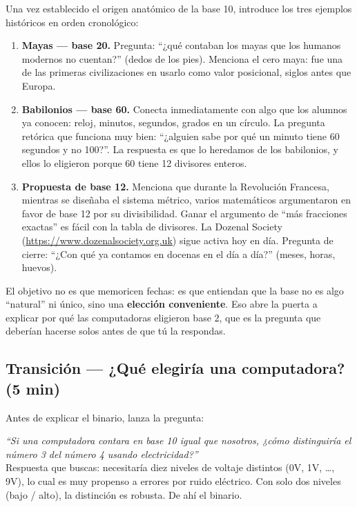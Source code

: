\documentclass[12pt, oneside]{article}
\begin{document}
Una vez establecido el origen anatómico de la base 10, introduce los tres
ejemplos históricos en orden cronológico:

\begin{enumerate}
  \item \textbf{Mayas — base 20.}
        Pregunta: ``¿qué contaban los mayas que los humanos modernos no
        cuentan?'' (dedos de los pies). Menciona el cero maya: fue una de
        las primeras civilizaciones en usarlo como valor posicional, siglos
        antes que Europa.

  \item \textbf{Babilonios — base 60.}
        Conecta inmediatamente con algo que los alumnos ya conocen: reloj,
        minutos, segundos, grados en un círculo. La pregunta retórica que
        funciona muy bien: ``¿alguien sabe por qué un minuto tiene 60 segundos
        y no 100?''. La respuesta es que lo heredamos de los babilonios, y
        ellos lo eligieron porque 60 tiene 12 divisores enteros.

  \item \textbf{Propuesta de base 12.}
        Menciona que durante la Revolución Francesa, mientras se diseñaba el
        sistema métrico, varios matemáticos argumentaron en favor de base 12
        por su divisibilidad. Ganar el argumento de ``más fracciones exactas''
        es fácil con la tabla de divisores.
        La Dozenal Society (\url{https://www.dozenalsociety.org.uk}) sigue
        activa hoy en día.
        Pregunta de cierre: ``¿Con qué ya contamos en docenas en el día a día?''
        (meses, horas, huevos).
\end{enumerate}

\begin{notaprofesor}
  El objetivo no es que memoricen fechas: es que entiendan que la base
  no es algo ``natural'' ni único, sino una \textbf{elección conveniente}.
  Eso abre la puerta a explicar por qué las computadoras eligieron base 2,
  que es la pregunta que deberían hacerse solos antes de que tú la respondas.
\end{notaprofesor}

\subsection{Transición — ¿Qué elegiría una computadora? (5 min)}

Antes de explicar el binario, lanza la pregunta:

\begin{notaprofesor}
  \textit{``Si una computadora contara en base 10 igual que nosotros,
  ¿cómo distinguiría el número 3 del número 4 usando electricidad?''}\\[4pt]
  Respuesta que buscas: necesitaría diez niveles de voltaje distintos
  (0V, 1V, \ldots, 9V), lo cual es muy propenso a errores por ruido
  eléctrico. Con solo dos niveles (bajo / alto), la distinción es robusta.
  De ahí el binario.
\end{notaprofesor}
\end{document}
